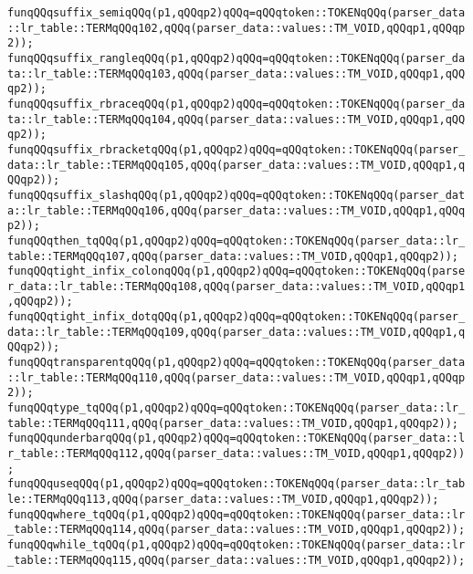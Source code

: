 \verb|funqQQqsuffix_semiqQQq(p1,qQQqp2)qQQq=qQQqtoken::TOKENqQQq(parser_data::lr_table::TERMqQQq102,qQQq(parser_data::values::TM_VOID,qQQqp1,qQQqp2));|\newline
\verb|funqQQqsuffix_rangleqQQq(p1,qQQqp2)qQQq=qQQqtoken::TOKENqQQq(parser_data::lr_table::TERMqQQq103,qQQq(parser_data::values::TM_VOID,qQQqp1,qQQqp2));|\newline
\verb|funqQQqsuffix_rbraceqQQq(p1,qQQqp2)qQQq=qQQqtoken::TOKENqQQq(parser_data::lr_table::TERMqQQq104,qQQq(parser_data::values::TM_VOID,qQQqp1,qQQqp2));|\newline
\verb|funqQQqsuffix_rbracketqQQq(p1,qQQqp2)qQQq=qQQqtoken::TOKENqQQq(parser_data::lr_table::TERMqQQq105,qQQq(parser_data::values::TM_VOID,qQQqp1,qQQqp2));|\newline
\verb|funqQQqsuffix_slashqQQq(p1,qQQqp2)qQQq=qQQqtoken::TOKENqQQq(parser_data::lr_table::TERMqQQq106,qQQq(parser_data::values::TM_VOID,qQQqp1,qQQqp2));|\newline
\verb|funqQQqthen_tqQQq(p1,qQQqp2)qQQq=qQQqtoken::TOKENqQQq(parser_data::lr_table::TERMqQQq107,qQQq(parser_data::values::TM_VOID,qQQqp1,qQQqp2));|\newline
\verb|funqQQqtight_infix_colonqQQq(p1,qQQqp2)qQQq=qQQqtoken::TOKENqQQq(parser_data::lr_table::TERMqQQq108,qQQq(parser_data::values::TM_VOID,qQQqp1,qQQqp2));|\newline
\verb|funqQQqtight_infix_dotqQQq(p1,qQQqp2)qQQq=qQQqtoken::TOKENqQQq(parser_data::lr_table::TERMqQQq109,qQQq(parser_data::values::TM_VOID,qQQqp1,qQQqp2));|\newline
\verb|funqQQqtransparentqQQq(p1,qQQqp2)qQQq=qQQqtoken::TOKENqQQq(parser_data::lr_table::TERMqQQq110,qQQq(parser_data::values::TM_VOID,qQQqp1,qQQqp2));|\newline
\verb|funqQQqtype_tqQQq(p1,qQQqp2)qQQq=qQQqtoken::TOKENqQQq(parser_data::lr_table::TERMqQQq111,qQQq(parser_data::values::TM_VOID,qQQqp1,qQQqp2));|\newline
\verb|funqQQqunderbarqQQq(p1,qQQqp2)qQQq=qQQqtoken::TOKENqQQq(parser_data::lr_table::TERMqQQq112,qQQq(parser_data::values::TM_VOID,qQQqp1,qQQqp2));|\newline
\verb|funqQQquseqQQq(p1,qQQqp2)qQQq=qQQqtoken::TOKENqQQq(parser_data::lr_table::TERMqQQq113,qQQq(parser_data::values::TM_VOID,qQQqp1,qQQqp2));|\newline
\verb|funqQQqwhere_tqQQq(p1,qQQqp2)qQQq=qQQqtoken::TOKENqQQq(parser_data::lr_table::TERMqQQq114,qQQq(parser_data::values::TM_VOID,qQQqp1,qQQqp2));|\newline
\verb|funqQQqwhile_tqQQq(p1,qQQqp2)qQQq=qQQqtoken::TOKENqQQq(parser_data::lr_table::TERMqQQq115,qQQq(parser_data::values::TM_VOID,qQQqp1,qQQqp2));|\newline
